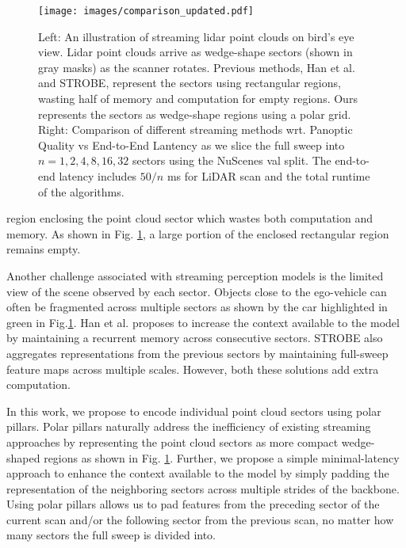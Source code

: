 \documentclass{article}
\begin{document}
\begin{figure}
  \centering 
\texttt{[image: images/comparison\_updated.pdf]} 
  \caption{Left: An illustration of streaming lidar point clouds on bird's eye view. Lidar point clouds arrive as wedge-shape sectors (shown in gray masks) as the scanner rotates. Previous methods, Han et al.\cite{han2020streaming} and STROBE\cite{frossard2020strobe}, represent the sectors using rectangular regions, wasting half of memory and computation for empty regions. Ours represents the sectors as wedge-shape regions using a polar grid. Right: Comparison of different streaming methods wrt. Panoptic Quality vs End-to-End Lantency as we slice the full sweep into $n=1,2,4,8,16,32$ sectors using the NuScenes\cite{caesar2019nuscenes} val split. The end-to-end latency includes $50/n$ ms for LiDAR scan and the total runtime of the algorithms.}\label{fig:packets}
\end{figure}\vspace{-3mm}

region enclosing the point cloud sector which wastes both computation and memory. As shown in Fig. \ref{fig:packets}, a large portion of the enclosed rectangular region remains empty. 

Another challenge associated with streaming perception models is the limited view of the scene observed by each sector. Objects close to the ego-vehicle can often be fragmented across multiple sectors as shown by the car highlighted in green in Fig.\ref{fig:packets}. Han et al.\cite{han2020streaming} proposes to increase the context available to the model by maintaining a recurrent memory across consecutive sectors. STROBE \cite{frossard2020strobe} also aggregates representations from the previous sectors by maintaining full-sweep feature maps across multiple scales. However, both these solutions add extra computation.


In this work, we propose to encode individual point cloud sectors using polar pillars. Polar pillars naturally address the inefficiency of existing streaming approaches by representing the point cloud sectors as more compact wedge-shaped regions as shown in Fig. \ref{fig:packets}. Further, we propose a simple minimal-latency approach to enhance the context available to the model by simply padding the representation of the neighboring sectors across multiple strides of the backbone. Using polar pillars allows us to pad features from the preceding sector of the current scan and/or the following sector from the previous scan, no matter how many sectors the full sweep is divided into.
\end{document}
